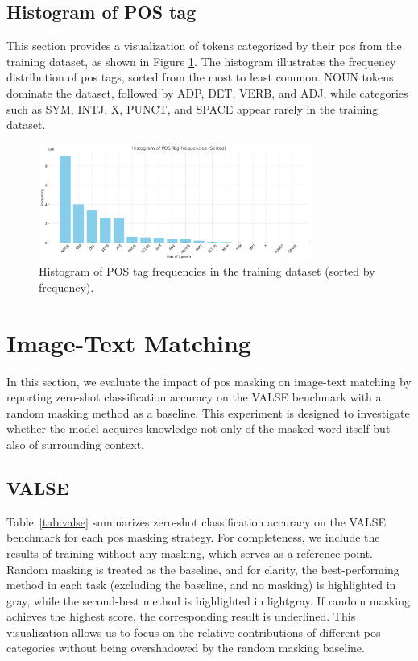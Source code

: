 \subsection{Histogram of POS tag}
This section provides a visualization of tokens categorized by their \acrshort{pos} from the training dataset, as shown in Figure \ref{fig:pos_count}.
The histogram illustrates the frequency distribution of \acrshort{pos} tags, sorted from the most to least common.
NOUN tokens dominate the dataset, followed by ADP, DET, VERB, and ADJ, while categories such as SYM, INTJ, X, PUNCT, and SPACE appear rarely in the training dataset.

\begin{figure}[H]
    \centering
    \includegraphics[width=0.8\textwidth]{Images/graph/pos_count.png}
    \caption{Histogram of POS tag frequencies in the training dataset (sorted by frequency).}
    \label{fig:pos_count}
\end{figure}

\section{Image-Text Matching}
In this section, we evaluate the impact of \acrshort{pos} masking on image-text matching by reporting zero-shot classification accuracy on the VALSE benchmark with a random masking method as a baseline.
This experiment is designed to investigate whether the model acquires knowledge not only of the masked word itself but also of surrounding context.

\subsection{VALSE}
Table~\ref{tab:valse} summarizes zero‐shot classification accuracy on the VALSE benchmark for each \acrshort{pos} masking strategy.
For completeness, we include the results of training without any masking, which serves as a reference point.
Random masking is treated as the baseline, and for clarity, the best-performing method in each task (excluding the baseline, and no masking) is highlighted in gray, while the second-best method is highlighted in lightgray.
If random masking achieves the highest score, the corresponding result is underlined.
This visualization allows us to focus on the relative contributions of different \acrshort{pos} categories without being overshadowed by the random masking baseline.

